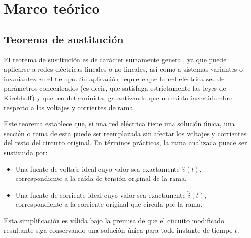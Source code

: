 \section{Marco teórico}

\subsection{Teorema de sustitución}
El teorema de sustitución es de carácter sumamente general, ya que puede aplicarse a redes eléctricas lineales o no lineales, así como a sistemas variantes o invariantes en el tiempo. Su aplicación requiere que la red eléctrica sea de parámetros concentrados (es decir, que satisfaga estrictamente las leyes de Kirchhoff) y que sea determinista, garantizando que no exista incertidumbre respecto a los voltajes y corrientes de rama.

Este teorema establece que, si una red eléctrica tiene una solución única, una sección o rama de esta puede ser reemplazada sin afectar los voltajes y corrientes del resto del circuito original. En términos prácticos, la rama analizada puede ser sustituida por:
\begin{itemize}
	\item Una fuente de voltaje ideal cuyo valor sea exactamente $\hat{v}(t)$, correspondiente a la caída de tensión original de la rama.
	\item Una fuente de corriente ideal cuyo valor sea exactamente $\hat{i}(t)$, correspondiente a la corriente original que circula por la rama.
\end{itemize}
Esta simplificación es válida bajo la premisa de que el circuito modificado resultante siga conservando una solución única para todo instante de tiempo $t$.

